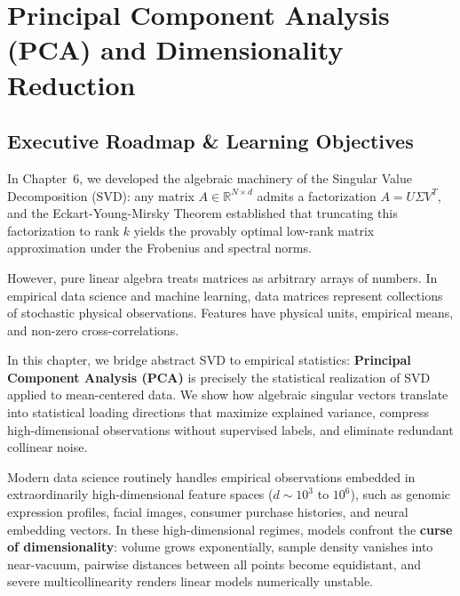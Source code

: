 \chapter[Principal Component Analysis]{Principal Component Analysis (PCA) and Dimensionality Reduction}
\label{chap:week07}

\section{Executive Roadmap \& Learning Objectives}

\begin{tcolorbox}[
    colback=primarylight!30,
    colframe=primarydark,
    title={\large \textbf{Architectural Bridge: From Matrix SVD to Empirical Statistical Geometry}},
    fonttitle=\bfseries\sffamily,
    arc=3mm,
    boxrule=1pt,
    width=\textwidth
]
In Chapter~6, we developed the algebraic machinery of the Singular Value Decomposition (SVD): any matrix $A \in \mathbb{R}^{N \times d}$ admits a factorization $A = U \Sigma V^T$, and the Eckart-Young-Mirsky Theorem established that truncating this factorization to rank $k$ yields the provably optimal low-rank matrix approximation under the Frobenius and spectral norms. 

However, pure linear algebra treats matrices as arbitrary arrays of numbers. In empirical data science and machine learning, data matrices represent collections of stochastic physical observations. Features have physical units, empirical means, and non-zero cross-correlations. 

In this chapter, we bridge abstract SVD to empirical statistics: \textbf{Principal Component Analysis (PCA)} is precisely the statistical realization of SVD applied to mean-centered data. We show how algebraic singular vectors translate into statistical loading directions that maximize explained variance, compress high-dimensional observations without supervised labels, and eliminate redundant collinear noise.
\end{tcolorbox}

Modern data science routinely handles empirical observations embedded in extraordinarily high-dimensional feature spaces ($d \sim 10^3$ to $10^6$), such as genomic expression profiles, facial images, consumer purchase histories, and neural embedding vectors. In these high-dimensional regimes, models confront the \textbf{curse of dimensionality}: volume grows exponentially, sample density vanishes into near-vacuum, pairwise distances between all points become equidistant, and severe multicollinearity renders linear models numerically unstable.

